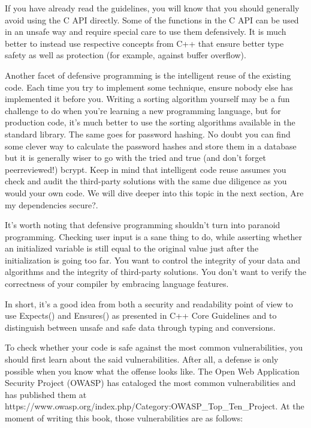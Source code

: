 If you have already read the guidelines, you will know that you should generally avoid using the C API directly. Some of the functions in the C API can be used in an unsafe way and require special care to use them defensively. It is much better to instead use respective concepts from C++ that ensure better type safety as well as protection (for example, against buffer overflow).

Another facet of defensive programming is the intelligent reuse of the existing code. Each time you try to implement some technique, ensure nobody else has implemented it before you. Writing a sorting algorithm yourself may be a fun challenge to do when you're learning a new programming language, but for production code, it's much better to use the sorting algorithms available in the standard library. The same goes for password hashing. No doubt you can find some clever way to calculate the password hashes and store them in a database but it is generally wiser to go with the tried and true (and don't forget peerreviewed!) bcrypt. Keep in mind that intelligent code reuse assumes you check and audit the third-party solutions with the same due diligence as  you would your own code. We will dive deeper into this topic in the next section, Are my dependencies secure?.

It's worth noting that defensive programming shouldn't turn into paranoid programming. Checking user input is a sane thing to do, while asserting whether an initialized variable is still equal to the original value just after the initialization is going too far. You want to control the integrity of your data and algorithms and the integrity of third-party solutions. You don't want to verify the correctness of your compiler by embracing language features.

In short, it's a good idea from both a security and readability point of view to use Expects() and Ensures() as presented in C++ Core Guidelines and to distinguish between unsafe and safe data through typing and conversions.


To check whether your code is safe against the most common vulnerabilities, you should first learn about the said vulnerabilities. After all, a defense is only possible when you know what the offense looks like. The Open Web Application Security Project (OWASP) has cataloged the most common vulnerabilities and has published them at https://www.owasp.org/index.php/Category:OWASP\_Top\_Ten\_Project. At the moment of writing this book, those vulnerabilities are as follows:

